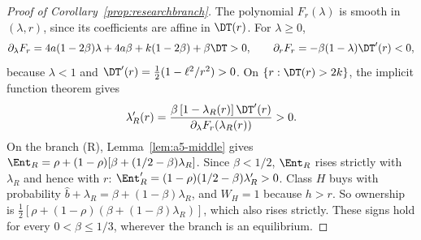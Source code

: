 \begin{proof}[Proof of Corollary~\ref{prop:researchbranch}]
The polynomial \(F_r(\lambda)\) is smooth in \((\lambda,r)\), since its coefficients are affine in \(\DT(r)\). For
\(\lambda\ge0\),
\[
\partial_\lambda F_r=4a(1-2\beta)\lambda+4a\beta+k(1-2\beta)+\beta\DT>0,\qquad
\partial_rF_r=-\beta(1-\lambda)\DT'(r)<0,
\]
because \(\lambda<1\) and \(\DT'(r)=\tfrac12(1-\ell^2/r^2)>0\). On \(\{r:\DT(r)>2k\}\), the implicit function theorem
gives
\[
\lambda_R'(r)=\frac{\beta\,[1-\lambda_R(r)]\,\DT'(r)}{\partial_\lambda F_r(\lambda_R(r))}>0 .
\]
On the branch (R), Lemma~\ref{lem:a5-middle} gives \(\Ent_R=\rho+(1-\rho)[\beta+(1/2-\beta)\lambda_R]\). Since
\(\beta<1/2\), \(\Ent_R\) rises strictly with \(\lambda_R\) and hence with \(r\):
\(\Ent_R'=(1-\rho)(1/2-\beta)\lambda_R'>0\). Class \(H\) buys with probability
\(\hat b+\lambda_R=\beta+(1-\beta)\lambda_R\), and \(W_H=1\) because \(h>r\). So ownership is
\(\tfrac12[\rho+(1-\rho)(\beta+(1-\beta)\lambda_R)]\), which also rises strictly. These signs hold for every
\(0<\beta\le1/3\), wherever the branch is an equilibrium.
\end{proof}


